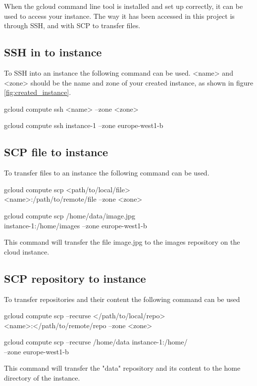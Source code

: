 When the gcloud command line tool is installed and set up correctly, it can be used to access your instance. The way it has been accessed in this project is through SSH, and with SCP to transfer files. 

\vspace{3mm}
\subsection{SSH in to instance}
To SSH into an instance the following command can be used. <name> and <zone> should be the name and zone of your created instance, as shown in figure \ref{fig:created_instance}.

\begin{lcverbatim}
    gcloud compute ssh <name> --zone <zone>
\end{lcverbatim}
\begin{lcverbatim}
    gcloud compute ssh instance-1 --zone europe-west1-b
\end{lcverbatim}

\subsection{SCP file to instance}
To transfer files to an instance the following command can be used. 
\begin{lcverbatim}
gcloud compute scp <path/to/local/file> \\ 
<name>:/path/to/remote/file --zone <zone>
\end{lcverbatim}
\begin{lcverbatim}
gcloud compute scp /home/data/image.jpg  \\
instance-1:/home/images --zone europe-west1-b
\end{lcverbatim}

This command will transfer the file image.jpg to the images repository on the cloud instance.

\subsection{SCP repository to instance}

\vspace{3mm}
\noindent
To transfer repositories and their content the following command can be used

\begin{lcverbatim}
gcloud compute scp --recurse </path/to/local/repo> \\ 
<name>:</path/to/remote/repo --zone <zone>
\end{lcverbatim}

\begin{lcverbatim}
gcloud compute scp --recurse /home/data instance-1:/home/ \\ 
--zone europe-west1-b
\end{lcverbatim}
\vspace{3mm}

\noindent
This command will transfer the "data" repository and its content to the home directory of the instance.

